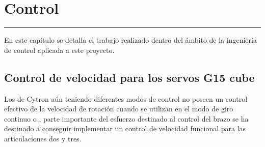 \chapter{Control} \label{chap:Control}
\hrule
\vspace{3mm}
En este capítulo se detalla el trabajo realizado dentro del ámbito de la ingeniería de control aplicada a este proyecto.

\section{Control de velocidad para los servos G15 cube} \label{sec:Control:velocidad_g15}

Los  de Cytron aún teniendo diferentes modos de control no poseen un control efectivo de la velocidad de rotación cuando se utilizan en el modo de giro continuo o , parte importante del esfuerzo destinado al control del brazo se ha destinado a conseguir implementar un control de velocidad funcional para las articulaciones dos y tres.
